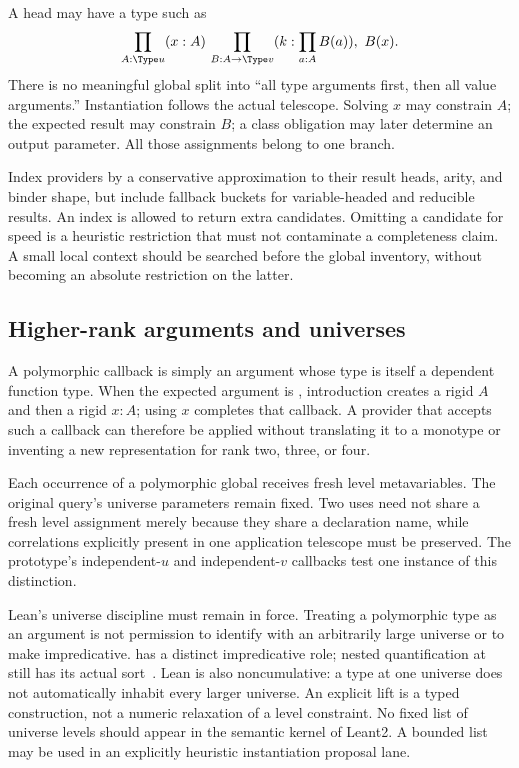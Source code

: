 A head may have a type such as
\[
 \prod_{A:\Type u}(x:A)\,
 \prod_{B:A\to\Type v}(k:\prod_{a:A}B(a)),\ B(x).
\]
There is no meaningful global split into ``all type arguments first, then all
value arguments.'' Instantiation follows the actual telescope. Solving $x$
may constrain $A$; the expected result may constrain $B$; a class obligation
may later determine an output parameter. All those assignments belong to one
branch.

Index providers by a conservative approximation to their result heads, arity,
and binder shape, but include fallback buckets for variable-headed and
reducible results. An index is allowed to return extra candidates. Omitting a
candidate for speed is a heuristic restriction that must not contaminate a
completeness claim. A small local context should be searched before the global
inventory, without becoming an absolute restriction on the latter.

\subsection{Higher-rank arguments and universes}

A polymorphic callback is simply an argument whose type is itself a dependent
function type. When the expected argument is
, introduction creates a rigid $A$ and then a rigid
$x:A$; using $x$ completes that callback. A provider that accepts such a callback
can therefore be applied without translating it to a monotype or inventing a
new representation for rank two, three, or four.

Each occurrence of a polymorphic global receives fresh level metavariables.
The original query's universe parameters remain fixed. Two uses need not share
a fresh level assignment merely because they share a declaration name, while
correlations explicitly present in one application telescope must be preserved.
The prototype's independent-$u$ and independent-$v$ callbacks test one instance
of this distinction.

Lean's universe discipline must remain in force. Treating a polymorphic type
as an argument is not permission to identify  with an arbitrarily
large universe or to make  impredicative.  has a distinct
impredicative role; nested quantification at  still has its actual
sort~\cite{lean-types}. Lean is also noncumulative: a type at one universe does not automatically
inhabit every larger universe. An explicit lift is a typed construction, not
a numeric relaxation of a level constraint. No fixed list of universe levels
should appear in the semantic kernel of Leant2. A bounded list may be used in an explicitly
heuristic instantiation proposal lane.

